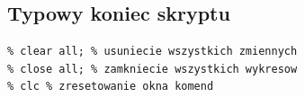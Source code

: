 \documentclass[10pt]{article}
\begin{document}
{}
\subsection*{Typowy koniec skryptu}

\begin{lstlisting}
% clear all; % usuniecie wszystkich zmiennych
% close all; % zamkniecie wszystkich wykresow
% clc % zresetowanie okna komend
\end{lstlisting}
\end{document}
